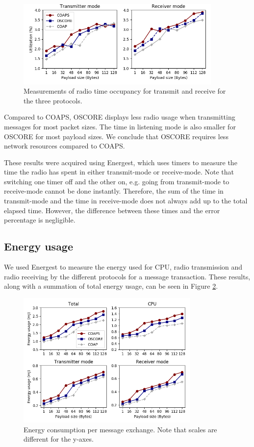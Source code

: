 {\begin{figure}[ht]
\centering
\includegraphics[width=0.9\textwidth]{papers/oscore/images/energest-radio.png}
\caption[Radio measurements]{Measurements of radio time occupancy for transmit and receive for the three protocols.}
\label{fig:energest}
\end{figure}

Compared to COAPS, OSCORE displays less radio usage when transmitting messages for most packet sizes. The time in listening mode is also smaller for OSCORE for most payload sizes. We conclude that OSCORE requires less network resources compared to COAPS.

These results were acquired using Energest, which uses timers to measure the time the radio has spent in either transmit-mode or receive-mode. Note that switching one timer off and the other on, e.g. going from transmit-mode to receive-mode cannot be done instantly. Therefore, the sum of the time in transmit-mode and the time in receive-mode does not always add up to the total elapsed time. However, the difference between these times and the error percentage is negligible.

\subsection{Energy usage}
We used Energest to measure the energy used for CPU, radio transmission and radio receiving by the different protocols for a message transaction. These results, along with a summation of total energy usage, can be seen in Figure \ref{fig:energy}.

\begin{figure}[ht]
\centering
\includegraphics[width=0.8\textwidth]{papers/oscore/images/energest-energy.png}
\caption[Energy Consumption per exchange]{Energy consumption per message exchange. Note that scales are different for the y-axes.}
\label{fig:energy}
\end{figure}

}
